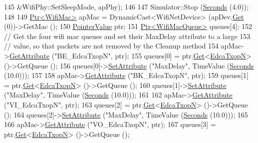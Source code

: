 \begin{DoxyCode}
145                                   &WifiPhy::SetSleepMode, apPhy);
146 
147   Simulator::Stop (\hyperlink{group__timecivil_ga33c34b816f8ff6628e33d5c8e9713b9e}{Seconds} (4.0));
148 
149   \hyperlink{classns3_1_1Ptr}{Ptr<WifiMac>} apMac = DynamicCast<WifiNetDevice> (apDev.\hyperlink{classns3_1_1NetDeviceContainer_a677d62594b5c9d2dea155cc5045f4d0b}{Get} (0))->GetMac ();
150   \hyperlink{classns3_1_1PointerValue}{PointerValue} ptr;
151   \hyperlink{classns3_1_1Ptr}{Ptr<WifiMacQueue>} queues[4];
152   \textcolor{comment}{// Get the four wifi mac queues and set their MaxDelay attribute to a large}
153   \textcolor{comment}{// value, so that packets are not removed by the Cleanup method}
154   apMac->\hyperlink{classns3_1_1ObjectBase_a895d1de2f96063d0e0fd78463e7a7e30}{GetAttribute} (\textcolor{stringliteral}{"BE\_EdcaTxopN"}, ptr);
155   queues[0] = ptr.\hyperlink{classns3_1_1PointerValue_ae8e90fe3c0810cd6e4e1b1ba31f52a66}{Get}<\hyperlink{classns3_1_1EdcaTxopN}{EdcaTxopN}> ()->GetQueue ();
156   queues[0]->\hyperlink{classns3_1_1ObjectBase_ac60245d3ea4123bbc9b1d391f1f6592f}{SetAttribute} (\textcolor{stringliteral}{"MaxDelay"}, TimeValue (\hyperlink{group__timecivil_ga33c34b816f8ff6628e33d5c8e9713b9e}{Seconds} (10.0)));
157 
158   apMac->\hyperlink{classns3_1_1ObjectBase_a895d1de2f96063d0e0fd78463e7a7e30}{GetAttribute} (\textcolor{stringliteral}{"BK\_EdcaTxopN"}, ptr);
159   queues[1] = ptr.\hyperlink{classns3_1_1PointerValue_ae8e90fe3c0810cd6e4e1b1ba31f52a66}{Get}<\hyperlink{classns3_1_1EdcaTxopN}{EdcaTxopN}> ()->GetQueue ();
160   queues[1]->\hyperlink{classns3_1_1ObjectBase_ac60245d3ea4123bbc9b1d391f1f6592f}{SetAttribute} (\textcolor{stringliteral}{"MaxDelay"}, TimeValue (\hyperlink{group__timecivil_ga33c34b816f8ff6628e33d5c8e9713b9e}{Seconds} (10.0)));
161 
162   apMac->\hyperlink{classns3_1_1ObjectBase_a895d1de2f96063d0e0fd78463e7a7e30}{GetAttribute} (\textcolor{stringliteral}{"VI\_EdcaTxopN"}, ptr);
163   queues[2] = ptr.\hyperlink{classns3_1_1PointerValue_ae8e90fe3c0810cd6e4e1b1ba31f52a66}{Get}<\hyperlink{classns3_1_1EdcaTxopN}{EdcaTxopN}> ()->GetQueue ();
164   queues[2]->\hyperlink{classns3_1_1ObjectBase_ac60245d3ea4123bbc9b1d391f1f6592f}{SetAttribute} (\textcolor{stringliteral}{"MaxDelay"}, TimeValue (\hyperlink{group__timecivil_ga33c34b816f8ff6628e33d5c8e9713b9e}{Seconds} (10.0)));
165 
166   apMac->\hyperlink{classns3_1_1ObjectBase_a895d1de2f96063d0e0fd78463e7a7e30}{GetAttribute} (\textcolor{stringliteral}{"VO\_EdcaTxopN"}, ptr);
167   queues[3] = ptr.\hyperlink{classns3_1_1PointerValue_ae8e90fe3c0810cd6e4e1b1ba31f52a66}{Get}<\hyperlink{classns3_1_1EdcaTxopN}{EdcaTxopN}> ()->GetQueue ();

\end{DoxyCode}
